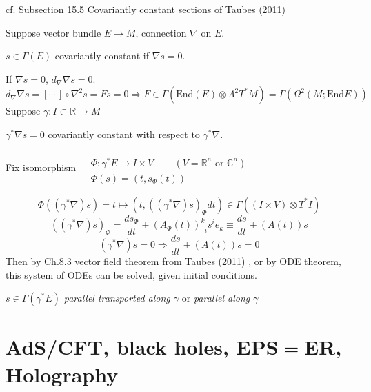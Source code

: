 \documentclass[10pt, twoside]{amsart}
\begin{document}
\begin{multicols*}{2}
cf. Subsection 15.5 Covariantly constant sections of  Taubes (2011) \cite{CTaubes2011}

Suppose vector bundle $E\to M$, connection $\nabla $ on $E$.  



$s\in \Gamma(E)$ covariantly constant if $\nabla s=0$.  

If $\nabla s = 0$, $d_{\nabla} \nabla s=0$.  
\[
d_{\nabla} \nabla s = [ \cdot \cdot ] \circ \nabla^2 s = Fs = 0 \Longrightarrow F  \in \Gamma(\text{End}(E)\otimes \Lambda^2 T^*M) = \Gamma(\Omega^2(M; \text{End}E))
\]
Suppose $\gamma : I \subset \mathbb{R} \to M$

$\gamma^* \nabla s =0$ covariantly constant with respect to $\gamma^* \nabla$.  

Fix isomorphism $\begin{aligned} & \quad \\
  & \Phi : \gamma^* E \to I \times V \qquad \, (V= \mathbb{R}^n \text{ or } \mathbb{C}^n) \\ 
  & \Phi(s) = (t,s_{\Phi}(t)) \end{aligned}$

\[
\Phi((\gamma^*\nabla)s) = t\mapsto (t,((\gamma^*\nabla )s)_{\Phi} dt) \in \Gamma((I\times V)\otimes T^*I ) 
\]
\[
((\gamma^* \nabla)s)_{\Phi} = \frac{ds_{\Phi}}{dt} + (A_{\Phi}(t))^k_{ \; \; i } s^i e_k \equiv \frac{ds}{dt} + (A(t))s
\]
\[
(\gamma^* \nabla)s = 0 \Longrightarrow \frac{ds}{dt} + (A(t))s = 0 
\]
Then by Ch.8.3 vector field theorem from Taubes (2011) \cite{CTaubes2011}, or by ODE theorem, this system of ODEs can be solved, given initial conditions.  




$s\in \Gamma(\gamma^* E)$ \emph{ parallel transported along $\gamma$} or \emph{ parallel along $\gamma$}

\part{AdS/CFT, black holes, EPS$=$ER, Holography}


\end{multicols*}
\end{document}
